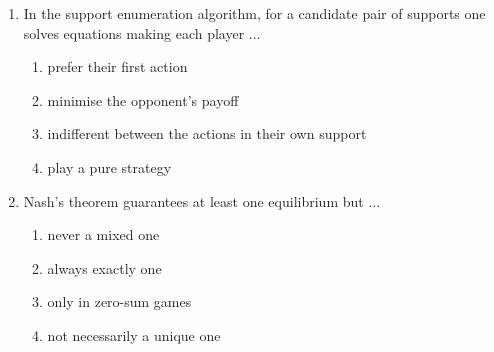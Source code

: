 \documentclass[11pt]{article}
\begin{document}
\begin{enumerate}[itemsep=6pt]
  \begin{enumerate}
    \item a probability distribution over that player's actions
    \item a payoff value
    \item an ordering of the opponents
    \item a single chosen action
  \end{enumerate}
  \item In the support enumeration algorithm, for a candidate pair of supports one solves equations making each player ...
  \begin{enumerate}
    \item prefer their first action
    \item minimise the opponent's payoff
    \item indifferent between the actions in their own support
    \item play a pure strategy
  \end{enumerate}
  \item Nash's theorem guarantees at least one equilibrium but ...
  \begin{enumerate}
    \item never a mixed one
    \item always exactly one
    \item only in zero-sum games
    \item not necessarily a unique one
  \end{enumerate}
\end{enumerate}
\end{document}
